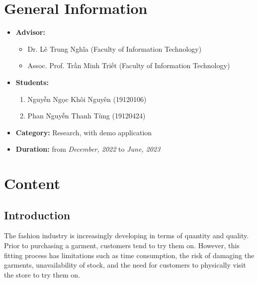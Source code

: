 \documentclass{article}[14pt]
\begin{document}
\Large
\section{General Information}
\begin{itemize}[label = {}]
    \item \textbf{Advisor:} 
    \begin{itemize}
        \item Dr. Lê Trung Nghĩa (Faculty of Information Technology)
        \item Assoc. Prof. Trần Minh Triết (Faculty of Information Technology)
    \end{itemize}{}

    
    \item \textbf{Students:}
    
    \begin{enumerate}
    
        \item Nguyễn Ngọc Khôi Nguyên (19120106) 
        \item Phan Nguyễn Thanh Tùng (19120424)
    \end{enumerate}

    \item \textbf{Category:} Research, with demo application
    
    \item \textbf{Duration:} from \textit{December, 2022} to \textit{June, 2023}
    
    
\end{itemize}

\pagebreak 

\section{Content}


\subsection{Introduction}
The fashion industry is increasingly developing in terms of quantity and quality. Prior to purchasing a garment, customers tend to try them on. However, this fitting process has limitations such as time consumption, the risk of damaging the garments, unavailability of stock, and the need for customers to physically visit the store to try them on.
\end{document}
